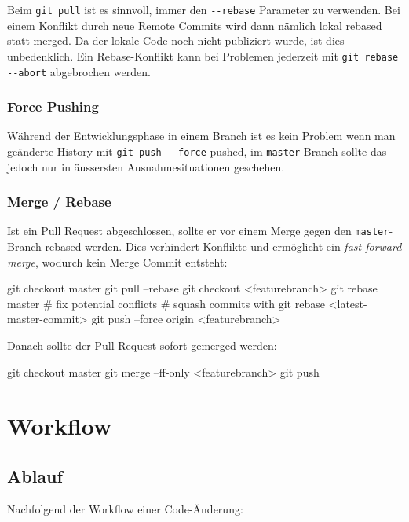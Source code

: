 Beim \texttt{git pull} ist es sinnvoll, immer den \texttt{-{}-rebase} Parameter zu
verwenden. Bei einem Konflikt durch neue Remote Commits wird dann nämlich lokal
rebased statt merged. Da der lokale Code noch nicht publiziert wurde, ist dies
unbedenklich. Ein Rebase-Konflikt kann bei Problemen jederzeit mit \texttt{git
rebase -{}-abort} abgebrochen werden.

\subsubsection{Force Pushing}

Während der Entwicklungsphase in einem Branch ist es kein Problem wenn man
geänderte History mit \texttt{git push -{}-force} pushed, im \texttt{master}
Branch sollte das jedoch nur in äussersten Ausnahmesituationen geschehen.

\subsubsection{Merge / Rebase}

Ist ein Pull Request abgeschlossen, sollte er vor einem Merge gegen den
\texttt{master}-Branch rebased werden. Dies verhindert Konflikte und ermöglicht
ein \textit{fast-forward merge}, wodurch kein Merge Commit entsteht:

\begin{bashcode}
git checkout master
git pull --rebase
git checkout <featurebranch>
git rebase master
# fix potential conflicts
# squash commits with git rebase <latest-master-commit>
git push --force origin <featurebranch>
\end{bashcode}

\noindent Danach sollte der Pull Request sofort gemerged werden:

\begin{bashcode}
git checkout master
git merge --ff-only <featurebranch>
git push
\end{bashcode}


\section{Workflow}

\subsection{Ablauf}

Nachfolgend der Workflow einer Code-Änderung:

